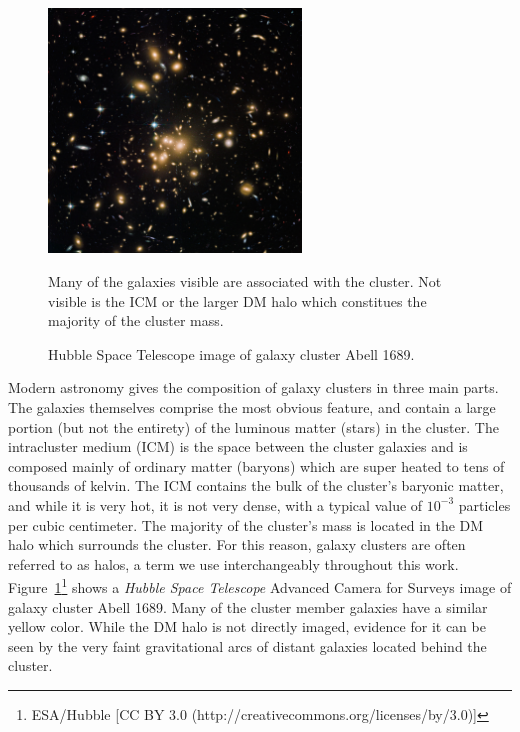 \begin{figure}[ht]
	\begin{center}
		\includegraphics[width=0.6\textwidth]{figures/abell1689_hubble.pdf} 
	\end{center}
	\singlespace
	\caption{Hubble Space Telescope image of galaxy cluster Abell 1689.} Many of the galaxies visible are associated with the cluster. Not visible is the ICM or the larger DM halo which constitues the majority of the cluster mass.
	\label{fig: abell1689_hubble} 
\end{figure}

Modern astronomy gives the composition of galaxy clusters in three main parts. The galaxies themselves comprise the most obvious feature, and contain a large portion (but not the entirety) of the luminous matter (stars) in the cluster. The intracluster medium (ICM) is the space between the cluster galaxies and is composed mainly of ordinary matter (baryons) which are super heated to tens of thousands of kelvin. The ICM contains the bulk of the cluster's baryonic matter, and while it is very hot, it is not very dense, with a typical value of $10^{-3}$ particles per cubic centimeter. The majority of the cluster's mass is located in the DM halo which surrounds the cluster. For this reason, galaxy clusters are often referred to as halos, a term we use interchangeably throughout this work. Figure~\ref{fig: abell1689_hubble}\footnote{ESA/Hubble [CC BY 3.0 (http://creativecommons.org/licenses/by/3.0)]} shows a \emph{Hubble Space Telescope} Advanced Camera for Surveys image of galaxy cluster Abell 1689. Many of the cluster member galaxies have a similar yellow color. While the DM halo is not directly imaged, evidence for it can be seen by the very faint gravitational arcs of distant galaxies located behind the cluster.

